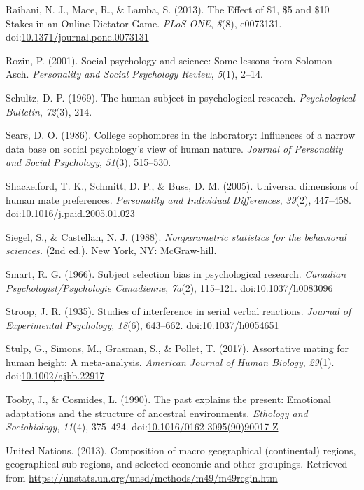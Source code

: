 \documentclass[english,man]{apa6}
\theoremstyle{definition}
\theoremstyle{definition}
\theoremstyle{remark}
\begin{document}
\hypertarget{ref-Raihani2013}{}
Raihani, N. J., Mace, R., \& Lamba, S. (2013). The Effect of \$1, \$5
and \$10 Stakes in an Online Dictator Game. \emph{PLoS ONE},
\emph{8}(8), e0073131.
doi:\href{https://doi.org/10.1371/journal.pone.0073131}{10.1371/journal.pone.0073131}

\hypertarget{ref-Rozin2001}{}
Rozin, P. (2001). Social psychology and science: Some lessons from
Solomon Asch. \emph{Personality and Social Psychology Review},
\emph{5}(1), 2--14.

\hypertarget{ref-Schultz1969}{}
Schultz, D. P. (1969). The human subject in psychological research.
\emph{Psychological Bulletin}, \emph{72}(3), 214.

\hypertarget{ref-Sears1986}{}
Sears, D. O. (1986). College sophomores in the laboratory: Influences of
a narrow data base on social psychology's view of human nature.
\emph{Journal of Personality and Social Psychology}, \emph{51}(3),
515--530.

\hypertarget{ref-Shackelford2005}{}
Shackelford, T. K., Schmitt, D. P., \& Buss, D. M. (2005). Universal
dimensions of human mate preferences. \emph{Personality and Individual
Differences}, \emph{39}(2), 447--458.
doi:\href{https://doi.org/10.1016/j.paid.2005.01.023}{10.1016/j.paid.2005.01.023}

\hypertarget{ref-Siegel1988}{}
Siegel, S., \& Castellan, N. J. (1988). \emph{Nonparametric statistics
for the behavioral sciences.} (2nd ed.). New York, NY: McGraw-hill.

\hypertarget{ref-Smart1966}{}
Smart, R. G. (1966). Subject selection bias in psychological research.
\emph{Canadian Psychologist/Psychologie Canadienne}, \emph{7a}(2),
115--121. doi:\href{https://doi.org/10.1037/h0083096}{10.1037/h0083096}

\hypertarget{ref-Stroop1935}{}
Stroop, J. R. (1935). Studies of interference in serial verbal
reactions. \emph{Journal of Experimental Psychology}, \emph{18}(6),
643--662. doi:\href{https://doi.org/10.1037/h0054651}{10.1037/h0054651}

\hypertarget{ref-Stulp2017}{}
Stulp, G., Simons, M., Grasman, S., \& Pollet, T. (2017). Assortative
mating for human height: A meta-analysis. \emph{American Journal of
Human Biology}, \emph{29}(1).
doi:\href{https://doi.org/10.1002/ajhb.22917}{10.1002/ajhb.22917}

\hypertarget{ref-Tooby1990}{}
Tooby, J., \& Cosmides, L. (1990). The past explains the present:
Emotional adaptations and the structure of ancestral environments.
\emph{Ethology and Sociobiology}, \emph{11}(4), 375--424.
doi:\href{https://doi.org/10.1016/0162-3095(90)90017-Z}{10.1016/0162-3095(90)90017-Z}

\hypertarget{ref-UnitedNations2013a}{}
United Nations. (2013). Composition of macro geographical (continental)
regions, geographical sub-regions, and selected economic and other
groupings. Retrieved from
\url{https://unstats.un.org/unsd/methods/m49/m49regin.htm}



\clearpage
\renewcommand{\listfigurename}{Figure captions}
\listoffigures
\end{document}
